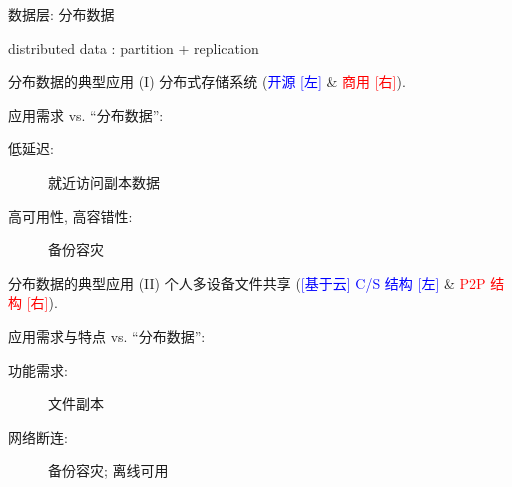 \begin{frame}{数据层: 分布数据}

  \begin{center}
    {\LARGE distributed data : partition + replication}
  \end{center}

\end{frame}
\begin{frame}{分布数据的典型应用 (I)}
  {分布式存储系统 (\textcolor{blue}{\scriptsize 开源 [左]} \& \textcolor{red}{\scriptsize 商用 [右]}).}

  应用需求  vs. ``分布数据'':
  \begin{description}
    \item[低延迟:] 就近访问副本数据
    \item[高可用性, 高容错性:] 备份容灾 
  \end{description}
\end{frame}
\begin{frame}{分布数据的典型应用 (II)}
  {个人多设备文件共享 {(\textcolor{blue}{\scriptsize [基于云] C/S 结构 [左]} \& 
  \textcolor{red}{\scriptsize P2P 结构 [右]}).}}

  应用需求与特点  vs. ``分布数据'':
  \begin{description}
    \item[功能需求:] 文件副本
    \item[网络断连:] 备份容灾; 离线可用
  \end{description}
\end{frame}
% 
